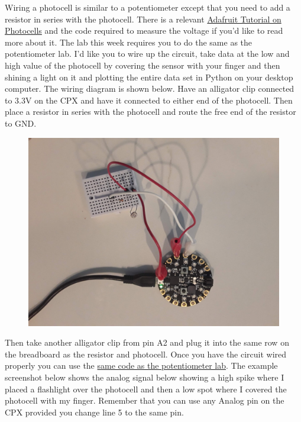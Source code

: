 Wiring a photocell is similar to a potentiometer except that you need to add a resistor in series with the photocell. There is a relevant \href{https://learn.adafruit.com/photocells/circuitpython}{Adafruit Tutorial on Photocells} and the code required to measure the voltage if you’d like to read more about it. The lab this week requires you to do the same as the potentiometer lab. I’d like you to wire up the circuit, take data at the low and high value of the photocell by covering the sensor with your finger and then shining a light on it and plotting the entire data set in Python on your desktop computer. The wiring diagram is shown below. Have an alligator clip connected to 3.3V on the CPX and have it connected to either end of the photocell. Then place a resistor in series with the photocell and route the free end of the resistor to GND.
\begin{figure}[H]
  \begin{center}
    \includegraphics[width=\textwidth]{Figures/photocell_circuit.jpeg}
  \end{center}
\end{figure}
Then take another alligator clip from pin A2 and plug it into the same
row on the breadboard as the resistor and photocell. Once you have the
circuit wired properly you can use
the \href{https://github.com/cmontalvo251/Microcontrollers/blob/master/Circuit_Playground/CircuitPython/Analog/analog_simple.py}{same
code as the potentiometer lab}. The example screenshot below shows the
analog signal below showing a high spike where I placed a flashlight
over the photocell and then a low spot where I covered the photocell
with my finger. Remember that you can use any Analog pin on the CPX
provided you change line 5 to the same pin. 

